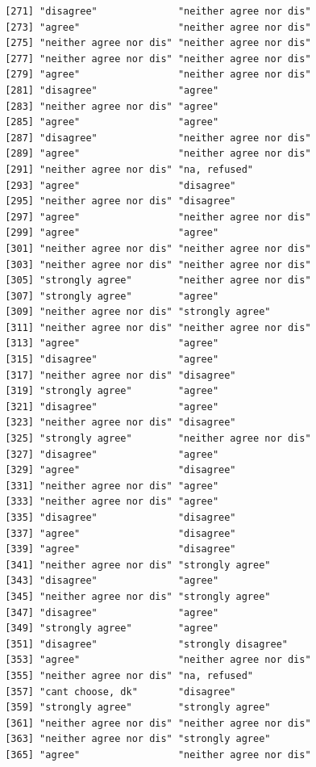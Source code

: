 \documentclass{beamer}\usepackage[]{graphicx}\usepackage[]{color}
\makeatletter
\newenvironment{kframe}{%
 \def\at@end@of@kframe{}%
 \ifinner\ifhmode%
  \def\at@end@of@kframe{\end{minipage}}%
  \begin{minipage}{\columnwidth}%
 \fi\fi%
 \def\FrameCommand##1{\hskip\@totalleftmargin \hskip-\fboxsep
 \colorbox{shadecolor}{##1}\hskip-\fboxsep
     \hskip-\linewidth \hskip-\@totalleftmargin \hskip\columnwidth}%
 \MakeFramed {\advance\hsize-\width
   \@totalleftmargin\z@ \linewidth\hsize
   \@setminipage}}%
 {\par\unskip\endMakeFramed%
 \at@end@of@kframe}
\newenvironment{knitrout}{}{} %
\makeatother
\begin{document}
\begin{frame}[fragile]
\begin{knitrout}
\begin{kframe}
\begin{verbatim}
 [271] "disagree"              "neither agree nor dis"
 [273] "agree"                 "neither agree nor dis"
 [275] "neither agree nor dis" "neither agree nor dis"
 [277] "neither agree nor dis" "neither agree nor dis"
 [279] "agree"                 "neither agree nor dis"
 [281] "disagree"              "agree"                
 [283] "neither agree nor dis" "agree"                
 [285] "agree"                 "agree"                
 [287] "disagree"              "neither agree nor dis"
 [289] "agree"                 "neither agree nor dis"
 [291] "neither agree nor dis" "na, refused"          
 [293] "agree"                 "disagree"             
 [295] "neither agree nor dis" "disagree"             
 [297] "agree"                 "neither agree nor dis"
 [299] "agree"                 "agree"                
 [301] "neither agree nor dis" "neither agree nor dis"
 [303] "neither agree nor dis" "neither agree nor dis"
 [305] "strongly agree"        "neither agree nor dis"
 [307] "strongly agree"        "agree"                
 [309] "neither agree nor dis" "strongly agree"       
 [311] "neither agree nor dis" "neither agree nor dis"
 [313] "agree"                 "agree"                
 [315] "disagree"              "agree"                
 [317] "neither agree nor dis" "disagree"             
 [319] "strongly agree"        "agree"                
 [321] "disagree"              "agree"                
 [323] "neither agree nor dis" "disagree"             
 [325] "strongly agree"        "neither agree nor dis"
 [327] "disagree"              "agree"                
 [329] "agree"                 "disagree"             
 [331] "neither agree nor dis" "agree"                
 [333] "neither agree nor dis" "agree"                
 [335] "disagree"              "disagree"             
 [337] "agree"                 "disagree"             
 [339] "agree"                 "disagree"             
 [341] "neither agree nor dis" "strongly agree"       
 [343] "disagree"              "agree"                
 [345] "neither agree nor dis" "strongly agree"       
 [347] "disagree"              "agree"                
 [349] "strongly agree"        "agree"                
 [351] "disagree"              "strongly disagree"    
 [353] "agree"                 "neither agree nor dis"
 [355] "neither agree nor dis" "na, refused"          
 [357] "cant choose, dk"       "disagree"             
 [359] "strongly agree"        "strongly agree"       
 [361] "neither agree nor dis" "neither agree nor dis"
 [363] "neither agree nor dis" "strongly agree"       
 [365] "agree"                 "neither agree nor dis"

\end{verbatim}
\end{kframe}
\end{knitrout}
\end{frame}
\end{document}
